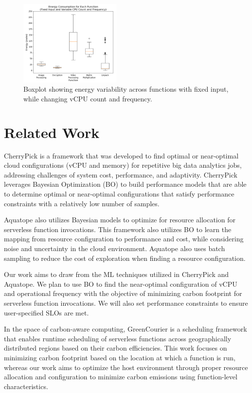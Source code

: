 \documentclass[times, 10pt,twocolumn]{article}
\begin{document}
\begin{figure}[ht]
   \centering
   \includegraphics[width=0.45\textwidth]{imgs/energy_boxplot.png}
   \caption{Boxplot showing energy variability across functions with fixed input, while changing vCPU count and frequency. }
   \label{fig:energy_boxplot}
 \end{figure}
\section{Related Work}
CherryPick \cite{CherryPick} is a framework that was developed to find optimal or near-optimal cloud configurations (vCPU and memory) for repetitive big data analytics jobs, addressing challenges of system cost, performance, and adaptivity. CherryPick leverages Bayesian Optimization (BO) to build performance models that are able to determine optimal or near-optimal configurations that satisfy performance constraints with a relatively low number of samples. 

Aquatope \cite{AQUATOPE} also utilizes Bayesian models to optimize for resource allocation for serverless function invocations. This framework also utilizes BO to learn the mapping from resource configuration to performance and cost, while considering noise and uncertainty in the cloud environment. Aquatope also uses batch sampling to reduce the cost of exploration when finding a resource configuration.

Our work aims to draw from the ML techniques utilized in CherryPick and Aquatope. We plan to use BO to find the near-optimal configuration of vCPU and operational frequency with the objective of minimizing carbon footprint for serverless function invocations. We will also set performance constraints to ensure user-specified SLOs are met.

In the space of carbon-aware computing, GreenCourier \cite{GreenCourier} is a scheduling framework that enables runtime scheduling of serverless functions across geographically distributed regions based on their carbon efficiencies. This work focuses on minimizing carbon footprint based on the location at which a function is run, whereas our work aims to optimize the host environment through proper resource allocation and configuration to minimize carbon emissions using function-level characteristics.
\end{document}

